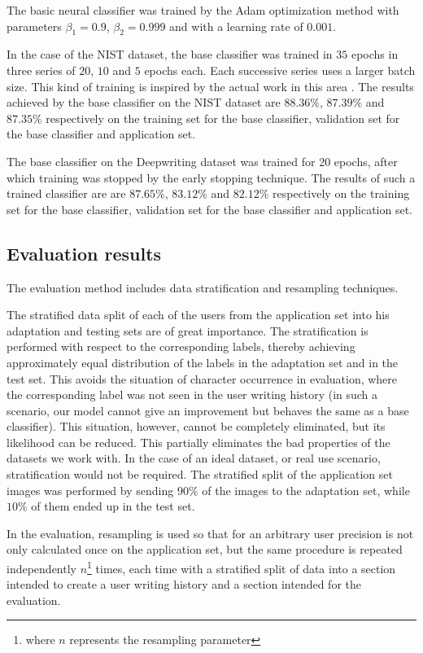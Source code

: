 \documentclass{article}
\begin{document}
The basic neural classifier was trained by the Adam optimization method with parameters $\beta_1=0.9$, $\beta_2=0.999$ and with a learning rate of $0.001$. 

In the case of the NIST dataset, the base classifier was trained in $35$ epochs in three series of $20$, $10$ and $5$ epochs each. 
Each successive series uses a larger batch size. 
This kind of training is inspired by the actual work in this area \citet{lrbs}. 
The results achieved by the base classifier on the NIST dataset are $88.36\%$, $87.39\%$ and $87.35\%$ respectively on the training set for the base classifier, validation set for the base classifier and application set. 

The base classifier on the Deepwriting dataset was trained for 20 epochs, after which training was stopped by the early stopping technique. 
The results of such a trained classifier are are $87.65\%$, $83.12\%$ and $82.12\%$ respectively on the training set for the base classifier, validation set for the base classifier and application set. 

\subsection{Evaluation results}

The evaluation method includes data stratification and resampling techniques. 

The stratified data split of each of the users from the application set into his adaptation and testing sets are of great importance. 
The stratification is performed with respect to the corresponding labels, thereby achieving approximately equal distribution of the labels in the adaptation set and in the test set. 
This avoids the situation of character occurrence in evaluation, where the corresponding label was not seen in the user writing history 
(in such a scenario, our model cannot give an improvement but behaves the same as a base classifier). 
This situation, however, cannot be completely eliminated, but its likelihood can be reduced. 
This partially eliminates the bad properties of the datasets we work with. 
In the case of an ideal dataset, or real use scenario, stratification would not be required. 
The stratified split of the application set images was performed by sending $90\%$ of the images to the adaptation set, while $10\%$ of them ended up in the test set. 

In the evaluation, resampling is used so that for an arbitrary user precision is not only calculated once on the application set, but the same procedure is repeated 
independently $n$\footnote{where $n$ represents the resampling parameter} times, 
each time with a stratified split of data into a section intended to create a user writing history and a section intended for the evaluation.  
\end{document}
